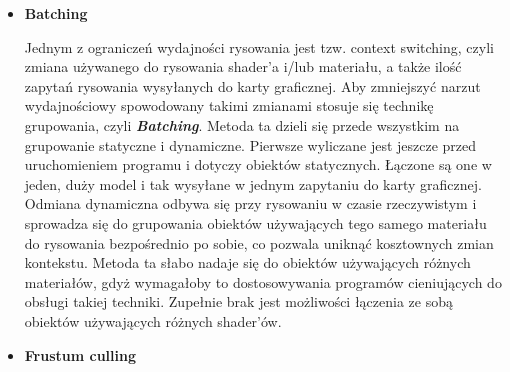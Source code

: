 \begin{itemize}
	\item \textbf{Batching}

	Jednym z ograniczeń wydajności rysowania jest tzw. context switching, czyli zmiana używanego do rysowania shader'a i/lub materiału, a także ilość zapytań rysowania wysyłanych do karty graficznej. Aby zmniejszyć narzut wydajnościowy spowodowany takimi zmianami stosuje się technikę grupowania, czyli \emph{\textbf{Batching}}.
	Metoda ta dzieli się przede wszystkim na grupowanie statyczne i dynamiczne. Pierwsze wyliczane jest jeszcze przed uruchomieniem programu i dotyczy obiektów statycznych. Łączone są one w jeden, duży model i tak wysyłane w jednym zapytaniu do karty graficznej. Odmiana dynamiczna odbywa się przy rysowaniu w czasie rzeczywistym i sprowadza się do grupowania obiektów używających tego samego materiału do rysowania bezpośrednio po sobie, co pozwala uniknąć kosztownych zmian kontekstu. Metoda ta słabo nadaje się do obiektów używających różnych materiałów, gdyż wymagałoby to dostosowywania programów cieniujących do obsługi takiej techniki. Zupełnie brak jest możliwości łączenia ze sobą obiektów używających różnych shader'ów.

	\item \textbf{Frustum culling}


\end{itemize}
